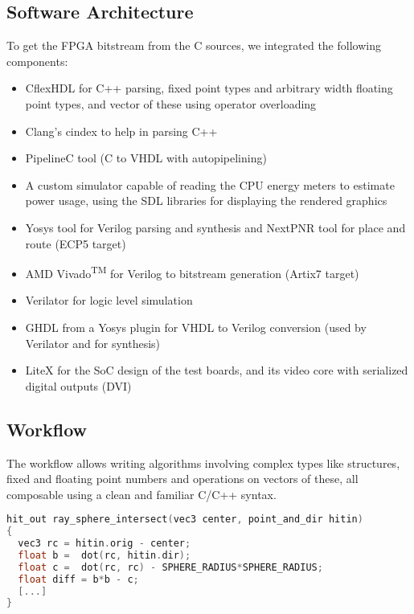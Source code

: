 \documentclass[conference]{IEEEtran}
\begin{document}
\subsection{Software Architecture}

To get the FPGA bitstream from the C sources, we integrated the following components:

\begin{itemize}
\item CflexHDL\cite{cflexhdl} for C++ parsing, fixed point types and arbitrary width floating point types, and vector of these using operator overloading
\item Clang’s cindex\cite{cindex} to help in parsing C++
\item PipelineC\cite{pipelinec} tool (C to VHDL with autopipelining)
\item A custom simulator capable of reading the CPU energy meters to estimate power usage, using the SDL\cite{sdllib} libraries for displaying the rendered graphics
\item Yosys\cite{yosys} tool for Verilog parsing and synthesis and NextPNR\cite{nextpnr} tool for place and route (ECP5 target)
\item AMD Vivado\textsuperscript{TM} for Verilog to bitstream generation (Artix7 target)
\item Verilator for logic level simulation
\item GHDL\cite{GHDL} from a Yosys plugin\cite{ghdlplugin} for VHDL to Verilog conversion (used by Verilator and for synthesis)
\item LiteX\cite{litex} for the SoC design of the test boards, and its video core with serialized digital outputs (DVI)
\end{itemize}


\subsection{Workflow}

The workflow allows writing algorithms involving complex types like structures, fixed and floating point numbers and operations on vectors of these, all composable using a clean and familiar C/C++ syntax.

\begin{lstlisting}[language=C++]
hit_out ray_sphere_intersect(vec3 center, point_and_dir hitin)
{
  vec3 rc = hitin.orig - center;
  float b =  dot(rc, hitin.dir);
  float c =  dot(rc, rc) - SPHERE_RADIUS*SPHERE_RADIUS;
  float diff = b*b - c;
  [...]
}
\end{lstlisting}
\end{document}
